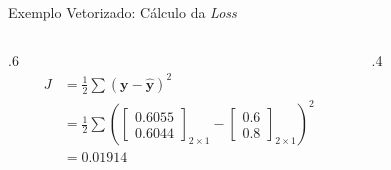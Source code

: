 \documentclass[aspectratio=169, xcolor=dvipsnames]{beamer}
\begin{document}
\begin{frame}{Exemplo Vetorizado: Cálculo da \textit{Loss}}
    \begin{columns}
        \begin{column}{.6\linewidth}
        \small
        \begin{align*}
         J &= \frac{1}{2}\sum (\mathbf{y} - \hat{\mathbf{y}})^{2}\\
         &= \frac{1}{2}\sum\left(\begin{bmatrix}
        0.6055 \\
        0.6044
      \end{bmatrix}_{2\times1} -              
      \begin{bmatrix}
                0.6 \\
                0.8
              \end{bmatrix}_{2\times1}\right)^2\\
      &= 0.01914
        \end{align*}                
        \end{column}
        \begin{column}{.4\textwidth}
            \begin{figure}
                \centering
                \resizebox{\linewidth}{!}{
                }
            \end{figure}
        \end{column}    
    \end{columns}

\end{frame}
\end{document}
